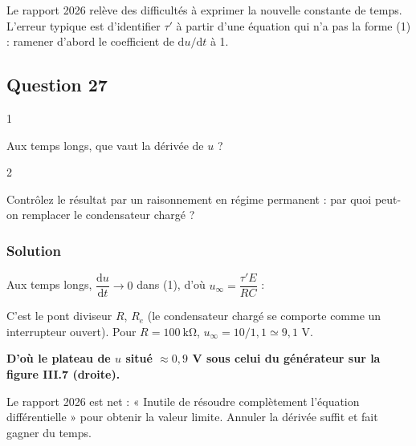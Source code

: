 \documentclass[11pt,a4paper]{article}
\newcommand{\equationajustee}[1]{%
  \sbox{\boiteequation}{$\displaystyle #1$}%
  \ifdim\wd\boiteequation>\linewidth
    \[\resizebox{\linewidth}{!}{\usebox{\boiteequation}}\]%
  \else
    \[#1\]%
  \fi}
\begin{document}
\begin{piege}

Le rapport 2026 relève des difficultés à exprimer la nouvelle constante de temps. L'erreur typique est d'identifier \(\tau'\) à partir d'une équation qui n'a pas la forme (1) : ramener d'abord le coefficient de \(\mathrm{d}u/\mathrm{d}t\) à 1.

\end{piege}

\hypertarget{question-27}{%
\subsection{Question 27}\label{question-27}}

\begin{indication}{1}

Aux temps longs, que vaut la dérivée de \(u\) ?

\end{indication}

\begin{indication}{2}

Contrôlez le résultat par un raisonnement en régime permanent : par quoi peut-on remplacer le condensateur chargé ?

\end{indication}

\hypertarget{solution-26}{%
\subsubsection{Solution}\label{solution-26}}

Aux temps longs, \(\dfrac{\mathrm{d}u}{\mathrm{d}t}\to0\) dans (1), d'où \(u_\infty=\dfrac{\tau'E}{RC}\) :

\equationajustee{\boxed{u_\infty=\frac{R_e}{R+R_e}E}}

C'est le pont diviseur \(R\), \(R_e\) (le condensateur chargé se comporte comme un interrupteur ouvert). Pour \(R=100\ \mathrm{k\Omega}\), \(u_\infty=10/1{,}1\simeq9{,}1\) V.

\textbf{D'où le plateau de \(u\) situé \(\approx0{,}9\) V sous celui du générateur sur la figure III.7 (droite).}

\begin{jury}

Le rapport 2026 est net : « Inutile de résoudre complètement l'équation différentielle » pour obtenir la valeur limite. Annuler la dérivée suffit et fait gagner du temps.

\end{jury}
\end{document}
